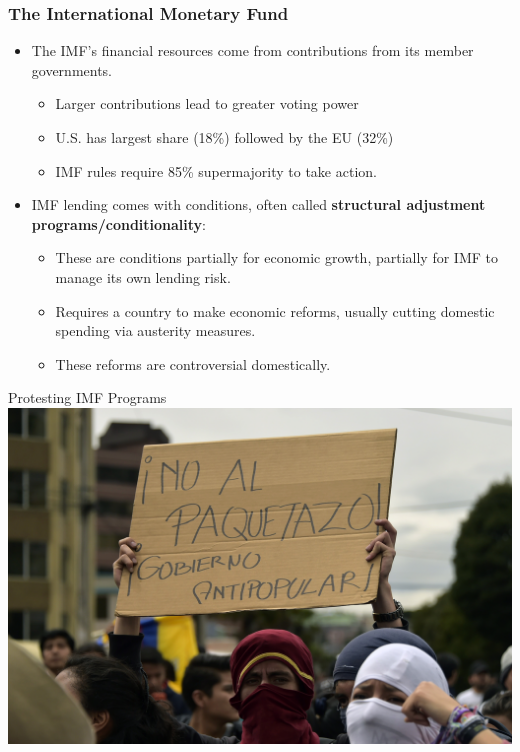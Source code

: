 \documentclass[handout]{beamer}
\begin{document}
\begin{frame} 
	\frametitle{\LARGE{The International Monetary Fund}}
	\begin{itemize}
		\item The IMF's financial resources come from contributions from its member governments. \pause 
		\begin{itemize}
			\item Larger contributions lead to greater voting power \pause 
			\item U.S. has largest share (18\%) followed by the EU (32\%) \pause 
			\item IMF rules require 85\% supermajority to take action.
		\end{itemize}
		\item IMF lending comes with conditions, often called \textbf{structural adjustment programs/conditionality}: \pause 
		\begin{itemize}
			\item These are conditions partially for economic growth, partially for IMF to manage its own lending risk. \pause 
			\item Requires a country to make economic reforms, usually cutting domestic spending via austerity measures. \pause 
			\item These reforms are controversial domestically. 
		\end{itemize}
	\end{itemize}
\end{frame}

\begin{frame}{\LARGE Protesting IMF Programs}
    \centering
\includegraphics[width=\textwidth,height=0.8\textheight,keepaspectratio]{ecuador imf.jpg}
\end{frame}
\end{document}
